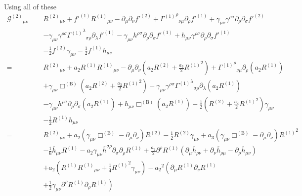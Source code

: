 \documentclass[a4paper, 11pt, titlepage, twoside]{report}
\newcommand{\recip}[1]{\ensuremath{\frac{1}{#1}}}
\begin{document}
{Using all of these
\begin{align}
{\mathcal{G}^{(2)}}_{\mu\nu} = {} & {R^{(2)}}_{\mu\nu} + f'^{(1)}{R^{(1)}}_{\mu\nu} - \partial_\mu\partial_\nu f'^{(2)} + {{\Gamma^{(1)}}^\rho}_{\nu\mu}\partial_\rho f'^{(1)} + \gamma_{\mu\nu}\gamma^{\rho\sigma}\partial_\rho\partial_\sigma f'^{(2)} \nonumber \\
 & - {} \gamma_{\mu\nu}\gamma^{\rho\sigma}{{\Gamma^{(1)}}^\lambda}_{\sigma\rho}\partial_\lambda f'^{(1)} - \gamma_{\mu\nu}h^{\rho\sigma}\partial_\rho\partial_\sigma f'^{(1)} + h_{\mu\nu}\gamma^{\rho\sigma}\partial_\rho\partial_\sigma f'^{(1)} \nonumber \\
 & - {} \recip{2}f^{(2)}\gamma_{\mu\nu} - \recip{2}f^{(1)}h_{\mu\nu} \nonumber \\
 = {} & {R^{(2)}}_{\mu\nu} + a_2R^{(1)}{R^{(1)}}_{\mu\nu} - \partial_\mu\partial_\nu \left(a_2R^{(2)} + \frac{a_3}{2}{R^{(1)}}^2\right) + {{\Gamma^{(1)}}^\rho}_{\nu\mu}\partial_\rho \left(a_2R^{(1)}\right) \nonumber \\
 & + {} \gamma_{\mu\nu}\Box^{(\mathrm{B})} \left(a_2R^{(2)} + \frac{a_3}{2}{R^{(1)}}^2\right) - \gamma_{\mu\nu}\gamma^{\rho\sigma}{{\Gamma^{(1)}}^\lambda}_{\sigma\rho}\partial_\lambda\left(a_2R^{(1)}\right) \nonumber \\
 & - {} \gamma_{\mu\nu}h^{\rho\sigma}\partial_\rho\partial_\sigma\left(a_2R^{(1)}\right) + h_{\mu\nu}\Box^{(\mathrm{B})}\left(a_2R^{(1)}\right) - \recip{2}\left(R^{(2)} + \frac{a_2}{2}{R^{(1)}}^2\right)\gamma_{\mu\nu} \nonumber \\
 & - {} \recip{2}R^{(1)}h_{\mu\nu} \nonumber \\
 = {} & {R^{(2)}}_{\mu\nu} + a_2\left(\gamma_{\mu\nu}\Box^{(\mathrm{B})} - \partial_\mu\partial_\nu\right)R^{(2)} - \recip{2}R^{(2)}\gamma_{\mu\nu} + a_3\left(\gamma_{\mu\nu}\Box^{(\mathrm{B})} - \partial_\mu\partial_\nu\right){R^{(1)}}^2 \nonumber \\
 & - {} \recip{6}\overline{h}_{\mu\nu}R^{(1)} - a_2\gamma_{\mu\nu}\overline{h}^{\sigma\rho}\partial_\sigma\partial_\rho R^{(1)} + \frac{a_2}{2} \partial^\rho R^{(1)} \left(\partial_\mu\overline{h}_{\rho\nu} + \partial_\nu\overline{h}_{\rho\mu} - \partial_\rho\overline{h}_{\mu\nu}\right) \nonumber \\
 & + {} a_2\left(R^{(1)}{R^{(1)}}_{\mu\nu} + \recip{4}{R^{(1)}}^2\gamma_{\mu\nu}\right) - {a_2}^2\left(\partial_\mu R^{(1)}\partial_\nu R^{(1)} \right. \nonumber \\
 & + \left. \recip{2} \gamma_{\mu\nu}\partial^\rho R^{(1)}\partial_\rho R^{(1)}\right)
\end{align}
}
\end{document}

